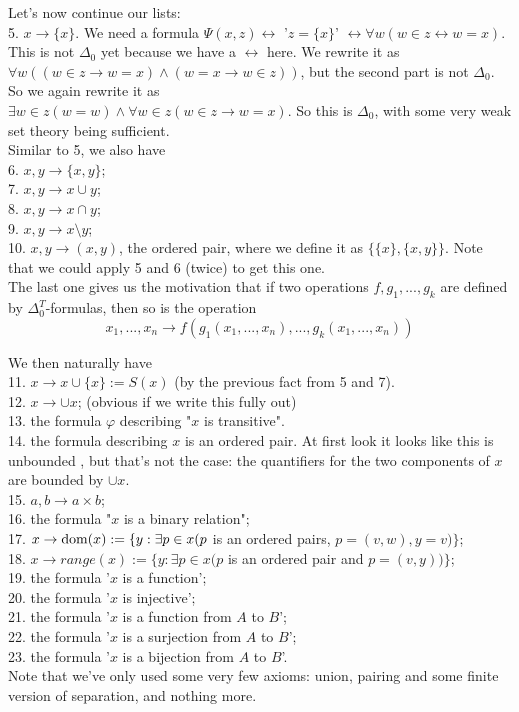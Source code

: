 \documentclass[a4paper]{article}
\begin{document}
Let's now continue our lists:\\
5. $x \to \{x\}$. We need a formula $\Psi(x,z) \leftrightarrow$ '$z=\{x\}$' $\leftrightarrow \forall w(w \in z \leftrightarrow w=x)$.\\
This is not $\Delta_0$ yet because we have a $\leftrightarrow$ here. We rewrite it as\\
$\forall w ((w \in z \to w=x) \wedge (w=x \to w \in z))$, but the second part is not $\Delta_0$. So we again rewrite it as\\
$\exists w \in z(w=w) \wedge \forall w \in z (w \in z \to w =x)$. So this is $\Delta_0$, with some very weak set theory being sufficient.\\
Similar to 5, we also have\\
6. $x,y \to \{x,y\}$;\\
7. $x,y \to x \cup y$;\\
8. $x,y \to x \cap y$;\\
9. $x,y \to x \setminus y$;\\
10. $x,y \to (x,y)$, the ordered pair, where we define it as $\{\{x\},\{x,y\}\}$. Note that we could apply 5 and 6 (twice) to get this one.\\
The last one gives us the motivation that if two operations $f,g_1,...,g_k$ are defined by $\Delta_0^T$-formulas, then so is the operation\\
$$x_1,...,x_n \to f(g_1(x_1,...,x_n),...,g_k(x_1,...,x_n))$$

We then naturally have\\
11. $x \to x \cup \{x\} := S(x)$ (by the previous fact from 5 and 7).\\
12. $x \to \cup x$; (obvious if we write this fully out)\\
13. the formula $\varphi$ describing "$x$ is transitive".\\
14. the formula describing $x$ is an ordered pair. At first look it looks like this is unbounded	, but that's not the case: the quantifiers for the two components of $x$ are bounded by $\cup x$.\\
15. $a,b \to a \times b$;\\
16. the formula "$x$ is a binary relation";\\
17. $x \to \operatorname{dom}(x) := \{y: \exists p \in x (p$ is an ordered pairs, $p=(v,w), y=v)\}$;\\
18. $x \to range(x):= \{y: \exists p \in x(p$ is an ordered pair and $p=(v,y))\}$;\\
19. the formula '$x$ is a function';\\
20. the formula '$x$ is injective';\\
21. the formula '$x$ is a function from $A$ to $B$';\\
22. the formula '$x$ is a surjection from $A$ to $B$';\\
23. the formula '$x$ is a bijection from $A$ to $B$'.\\
Note that we've only used some very few axioms: union, pairing and some finite version of separation, and nothing more.\\
\end{document}
